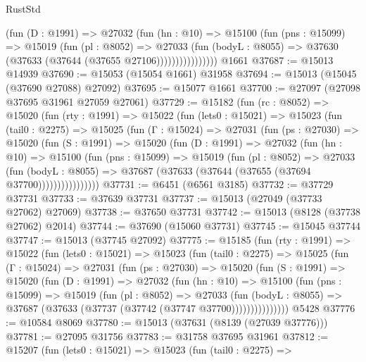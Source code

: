 \begin{lexlean}{RustStd}
\begin{coremodule}
                    (fun (D : @1991) =>
                    @27032
                      (fun (hn : @10) =>
                      @15100
                        (fun (pns : @15099) =>
                        @15019
                          (fun (pl : @8052) =>
                          @27033
                            (fun (bodyL : @8055) =>
                            @37630 (@37633 (@37644 (@37655 @27106))))))))))))))))
    @1661
@37687 := @15013 @14939
@37690 := @15053 (@15054 @1661) @31958
@37694 := @15013 (@15045 (@37690 @27088) @27092)
@37695 := @15077 @1661
@37700 := @27097 (@27098 @37695 @31961 @27059 @27061)
@37729 := @15182
    (fun (rc : @8052) =>
    @15020
      (fun (rty : @1991) =>
      @15022
        (fun (lets0 : @15021) =>
        @15023
          (fun (tail0 : @2275) =>
          @15025
            (fun (Γ : @15024) =>
            @27031
              (fun (ps : @27030) =>
              @15020
                (fun (S : @1991) =>
                @15020
                  (fun (D : @1991) =>
                  @27032
                    (fun (hn : @10) =>
                    @15100
                      (fun (pns : @15099) =>
                      @15019
                        (fun (pl : @8052) =>
                        @27033
                          (fun (bodyL : @8055) =>
                          @37687 (@37633 (@37644 (@37655 (@37694 @37700))))))))))))))))
@37731 := @6451 (@6561 @3185)
@37732 := @37729 @37731
@37733 := @37639 @37731
@37737 := @15013 (@27049 (@37733 @27062) @27069)
@37738 := @37650 @37731
@37742 := @15013 (@8128 (@37738 @27062) @2014)
@37744 := @37690 (@15060 @37731)
@37745 := @15045 @37744
@37747 := @15013 (@37745 @27092)
@37775 := @15185
    (fun (rty : @1991) =>
    @15022
      (fun (lets0 : @15021) =>
      @15023
        (fun (tail0 : @2275) =>
        @15025
          (fun (Γ : @15024) =>
          @27031
            (fun (ps : @27030) =>
            @15020
              (fun (S : @1991) =>
              @15020
                (fun (D : @1991) =>
                @27032
                  (fun (hn : @10) =>
                  @15100
                    (fun (pns : @15099) =>
                    @15019
                      (fun (pl : @8052) =>
                      @27033
                        (fun (bodyL : @8055) =>
                        @37687 (@37633 (@37737 (@37742 (@37747 @37700)))))))))))))))
    @5428
@37776 := @10584 @8069
@37780 := @15013 (@37631 (@8139 (@27039 @37776)))
@37781 := @27095 @31756
@37783 := @31758 @37695 @31961
@37812 := @15207
    (fun (lets0 : @15021) =>
    @15023
      (fun (tail0 : @2275) =>

\end{coremodule}
\end{lexlean}
